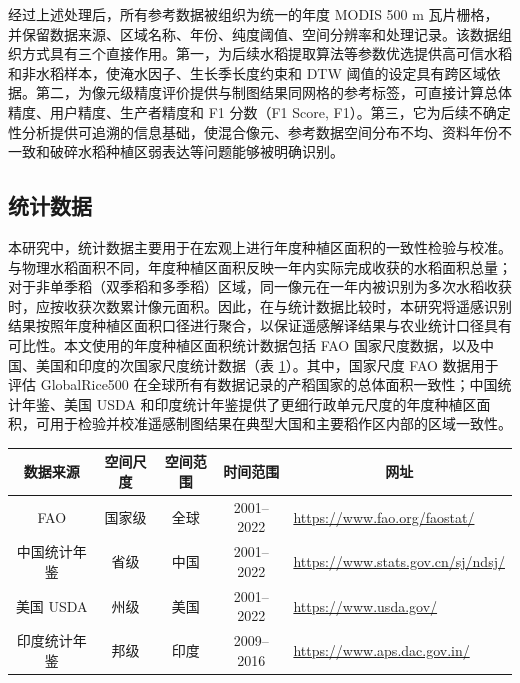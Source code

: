 经过上述处理后，所有参考数据被组织为统一的年度 MODIS 500 m 瓦片栅格，并保留数据来源、区域名称、年份、纯度阈值、空间分辨率和处理记录。该数据组织方式具有三个直接作用。第一，为后续水稻提取算法等参数优选提供高可信水稻和非水稻样本，使淹水因子、生长季长度约束和 DTW 阈值的设定具有跨区域依据。第二，为像元级精度评价提供与制图结果同网格的参考标签，可直接计算总体精度、用户精度、生产者精度和 F1 分数（F1 Score, F1）。第三，它为后续不确定性分析提供可追溯的信息基础，使混合像元、参考数据空间分布不均、资料年份不一致和破碎水稻种植区弱表达等问题能够被明确识别。

\subsection{统计数据}

本研究中，统计数据主要用于在宏观上进行年度种植区面积的一致性检验与校准。与物理水稻面积不同，年度种植区面积反映一年内实际完成收获的水稻面积总量；对于非单季稻（双季稻和多季稻）区域，同一像元在一年内被识别为多次水稻收获时，应按收获次数累计像元面积。因此，在与统计数据比较时，本研究将遥感识别结果按照年度种植区面积口径进行聚合，以保证遥感解译结果与农业统计口径具有可比性。本文使用的年度种植区面积统计数据包括 FAO 国家尺度数据，以及中国、美国和印度的次国家尺度统计数据（表 \ref{tab:rice_statistics_datasets}）。其中，国家尺度 FAO 数据用于评估 GlobalRice500 在全球所有有数据记录的产稻国家的总体面积一致性；中国统计年鉴、美国 USDA 和印度统计年鉴提供了更细行政单元尺度的年度种植区面积，可用于检验并校准遥感制图结果在典型大国和主要稻作区内部的区域一致性。

\begin{table}[htbp]
    \centering
    \label{tab:rice_statistics_datasets}
    \begin{tabular}{ccccl}
        \toprule
        数据来源 & 空间尺度 & 空间范围 & 时间范围 & \multicolumn{1}{c}{网址} \\
        \midrule
        FAO & 国家级 & 全球 & 2001--2022 & \url{https://www.fao.org/faostat/} \\
        中国统计年鉴 & 省级 & 中国 & 2001--2022 & \url{https://www.stats.gov.cn/sj/ndsj/} \\
        美国 USDA & 州级 & 美国 & 2001--2022 & \url{https://www.usda.gov/} \\
        印度统计年鉴 & 邦级 & 印度 & 2009--2016 & \url{https://www.aps.dac.gov.in/} \\
        \bottomrule
    \end{tabular}
\end{table}

